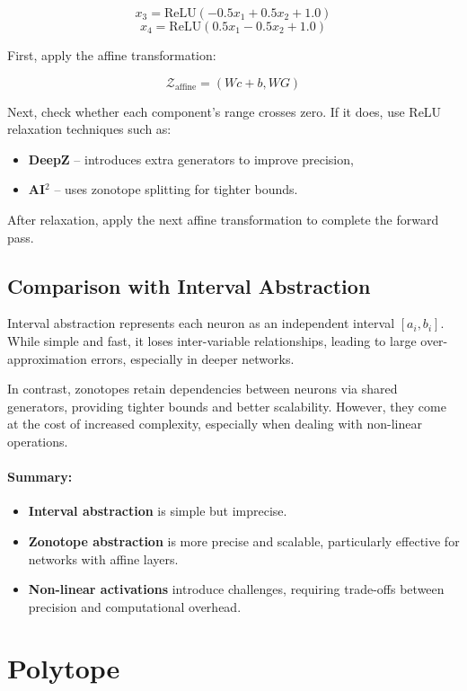 \documentclass[oneside,11pt,dvipsnames]{book}
\numberwithin{equation}{section}
\theoremstyle{definition}
\theoremstyle{remark}
\begin{document}
\[
x_3 = \text{ReLU}(-0.5x_1 + 0.5x_2 + 1.0)
\]
\[
x_4 = \text{ReLU}(0.5x_1 - 0.5x_2 + 1.0)
\]

First, apply the affine transformation:

\[
\mathcal{Z}_{\text{affine}} = (Wc + b, WG)
\]

Next, check whether each component's range crosses zero. If it does, use ReLU relaxation techniques such as:

\begin{itemize}
    \item \textbf{DeepZ} – introduces extra generators to improve precision,
    \item \textbf{AI\(^2\)} – uses zonotope splitting for tighter bounds.
\end{itemize}

After relaxation, apply the next affine transformation to complete the forward pass.

\subsection{Comparison with Interval Abstraction}

Interval abstraction represents each neuron as an independent interval \([a_i, b_i]\). While simple and fast, it loses inter-variable relationships, leading to large over-approximation errors, especially in deeper networks.

In contrast, zonotopes retain dependencies between neurons via shared generators, providing tighter bounds and better scalability. However, they come at the cost of increased complexity, especially when dealing with non-linear operations.

\paragraph{Summary:}
\begin{itemize}
    \item \textbf{Interval abstraction} is simple but imprecise.
    \item \textbf{Zonotope abstraction} is more precise and scalable, particularly effective for networks with affine layers.
    \item \textbf{Non-linear activations} introduce challenges, requiring trade-offs between precision and computational overhead.
\end{itemize}



\section{Polytope}
\end{document}
